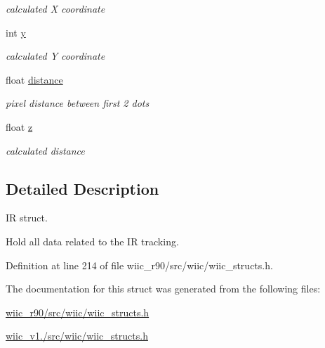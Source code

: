 \begin{DoxyCompactItemize}
\begin{DoxyCompactList}\small\item\em calculated X coordinate \end{DoxyCompactList}\item 
\hypertarget{structir__t_aecf2c4663aab868d326caeb7ffd01229}{int \hyperlink{structir__t_aecf2c4663aab868d326caeb7ffd01229}{y}}\label{structir__t_aecf2c4663aab868d326caeb7ffd01229}

\begin{DoxyCompactList}\small\item\em calculated Y coordinate \end{DoxyCompactList}\item 
\hypertarget{structir__t_ae964cb719e73986be124cf190d66d44d}{float \hyperlink{structir__t_ae964cb719e73986be124cf190d66d44d}{distance}}\label{structir__t_ae964cb719e73986be124cf190d66d44d}

\begin{DoxyCompactList}\small\item\em pixel distance between first 2 dots \end{DoxyCompactList}\item 
\hypertarget{structir__t_a94c67dc38b051479b8d786449449c864}{float \hyperlink{structir__t_a94c67dc38b051479b8d786449449c864}{z}}\label{structir__t_a94c67dc38b051479b8d786449449c864}

\begin{DoxyCompactList}\small\item\em calculated distance \end{DoxyCompactList}\end{DoxyCompactItemize}


\subsection{Detailed Description}
I\-R struct. 

Hold all data related to the I\-R tracking. 

Definition at line 214 of file wiic\-\_\-r90/src/wiic/wiic\-\_\-structs.\-h.



The documentation for this struct was generated from the following files\-:\begin{DoxyCompactItemize}
\item 
\hyperlink{wiic__r90_2src_2wiic_2wiic__structs_8h}{wiic\-\_\-r90/src/wiic/wiic\-\_\-structs.\-h}\item 
\hyperlink{wiic__v1_81_2src_2wiic_2wiic__structs_8h}{wiic\-\_\-v1./src/wiic/wiic\-\_\-structs.\-h}\end{DoxyCompactItemize}
